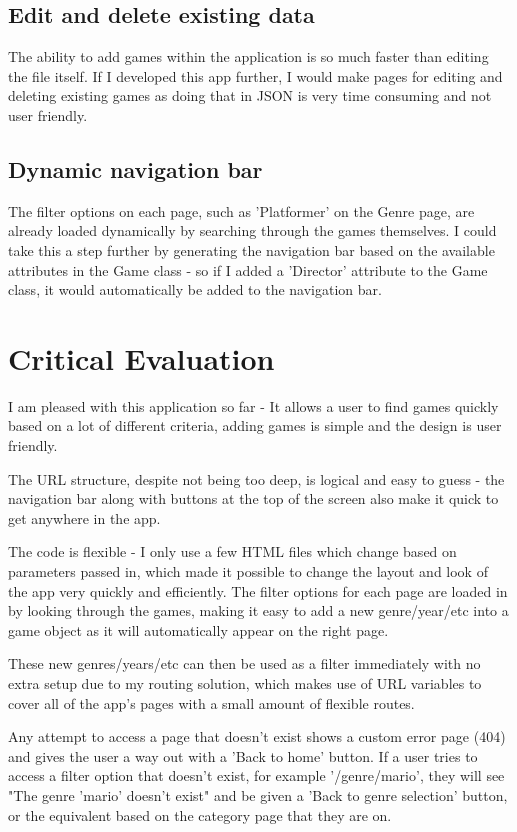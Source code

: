 \documentclass[10pt, a4paper]{article}
\begin{document}
	\subsection{Edit and delete existing data}
	The ability to add games within the application is so much faster than editing the file itself. If I developed this app further, I would make pages for editing and deleting existing games as doing that in JSON is very time consuming and not user friendly.
	
	\subsection{Dynamic navigation bar}
	The filter options on each page, such as 'Platformer' on the Genre page, are already loaded dynamically by searching through the games themselves. I could take this a step further by generating the navigation bar based on the available attributes in the Game class - so if I added a 'Director' attribute to the Game class, it would automatically be added to the navigation bar.
	
	\section{Critical Evaluation}
	I am pleased with this application so far - It allows a user to find games quickly based on a lot of different criteria, adding games is simple and the design is user friendly.
	
	The URL structure, despite not being too deep, is logical and easy to guess - the navigation bar along with buttons at the top of the screen also make it quick to get anywhere in the app.
	
	The code is flexible - I only use a few HTML files which change based on parameters passed in, which made it possible to change the layout and look of the app very quickly and efficiently. The filter options for each page are loaded in by looking through the games, making it easy to add a new genre/year/etc into a game object as it will automatically appear on the right page. 
	
	These new genres/years/etc can then be used as a filter immediately with no extra setup due to my routing solution, which makes use of URL variables to cover all of the app's pages with a small amount of flexible routes. 
	
	Any attempt to access a page that doesn't exist shows a custom error page (404) and gives the user a way out with a 'Back to home' button. If a user tries to access a filter option that doesn't exist, for example '/genre/mario', they will see "The genre 'mario' doesn't exist" and be given a 'Back to genre selection' button, or the equivalent based on the category page that they are on.
	
\end{document}
